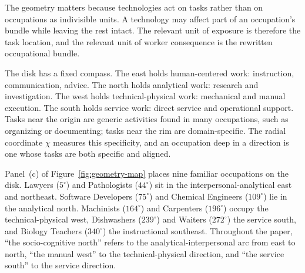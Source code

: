 \documentclass[12pt, a4paper]{article}
\begin{document}
The geometry matters because technologies act on tasks rather than on
occupations as indivisible units. A technology may affect part of an
occupation's bundle while leaving the rest intact. The relevant unit of
exposure is therefore the task location, and the relevant unit of
worker consequence is the rewritten occupational bundle.

The disk has a fixed compass. The east holds human-centered work:
instruction, communication, advice. The north holds analytical work:
research and investigation. The west holds technical-physical work:
mechanical and manual execution. The south holds service work: direct
service and operational support. Tasks near the origin are generic
activities found in many occupations, such as organizing or
documenting; tasks near the rim are domain-specific. The radial
coordinate $\chi$ measures this specificity, and an occupation deep in
a direction is one whose tasks are both specific and aligned.

Panel~(c) of Figure~\ref{fig:geometry-map} places nine familiar
occupations on the disk. Lawyers ($5^\circ$) and Pathologists ($44^\circ$) sit in the
interpersonal-analytical east and northeast. Software Developers
($75^\circ$) and Chemical Engineers ($109^\circ$) lie in the analytical
north. Machinists ($164^\circ$) and Carpenters ($196^\circ$) occupy
the technical-physical west, Dishwashers ($239^\circ$) and Waiters
($272^\circ$) the service south, and Biology Teachers ($340^\circ$) the
instructional southeast. Throughout the paper, ``the socio-cognitive
north'' refers to the analytical-interpersonal arc from east to north,
``the manual west'' to the technical-physical direction, and ``the
service south'' to the service direction.
\end{document}
